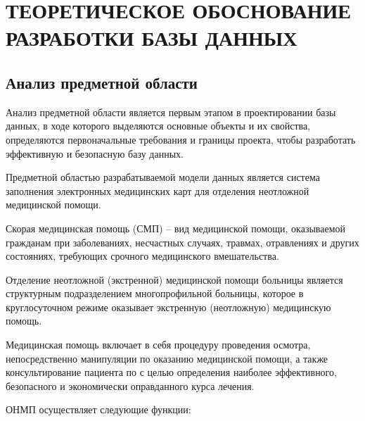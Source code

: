 \section{ТЕОРЕТИЧЕСКОЕ ОБОСНОВАНИЕ РАЗРАБОТКИ БАЗЫ ДАННЫХ}

\subsection{Анализ предметной области}

Анализ предметной области является первым этапом в проектировании базы данных, в ходе которого выделяются основные объекты и их свойства, определяются первоначальные требования и границы проекта, чтобы разработать эффективную и безопасную базу данных.

Предметной областью разрабатываемой модели данных является система заполнения электронных медицинских карт для отделения неотложной медицинской помощи.

Скорая медицинская помощь (СМП) – вид медицинской помощи, оказываемой гражданам при заболеваниях, несчастных случаях, травмах, отравлениях и других состояниях, требующих срочного медицинского вмешательства.

Отделение неотложной (экстренной) медицинской помощи больницы является структурным подразделением многопрофильной больницы, которое в круглосуточном режиме оказывает экстренную (неотложную) медицинскую помощь.

Медицинская помощь включает в себя процедуру проведения осмотра, непосредственно манипуляции по оказанию медицинской помощи, а также консультирование пациента по с целью определения наиболее эффективного, безопасного и экономически оправданного курса лечения.

ОНМП осуществляет следующие функции:

